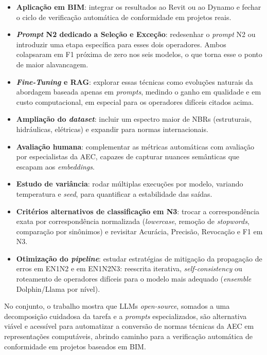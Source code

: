 \documentclass[a4paper,fleqn]{cas-sc}
\begin{document}
\begin{itemize}
    \item \textbf{Aplicação em BIM}: integrar os resultados ao Revit ou ao Dynamo e fechar o ciclo de verificação automática de conformidade em projetos reais.
    \item \textbf{\textit{Prompt} N2 dedicado a Seleção e Exceção}: redesenhar o \textit{prompt} N2 ou introduzir uma etapa específica para esses dois operadores. Ambos colapsaram em F1 próxima de zero nos seis modelos, o que torna esse o ponto de maior alavancagem.
    \item \textbf{\textit{Fine-Tuning} e RAG}: explorar essas técnicas como evoluções naturais da abordagem baseada apenas em \textit{prompts}, medindo o ganho em qualidade e em custo computacional, em especial para os operadores difíceis citados acima.
    \item \textbf{Ampliação do \textit{dataset}}: incluir um espectro maior de NBRs (estruturais, hidráulicas, elétricas) e expandir para normas internacionais.
    \item \textbf{Avaliação humana}: complementar as métricas automáticas com avaliação por especialistas da AEC, capazes de capturar nuances semânticas que escapam aos \textit{embeddings}.
    \item \textbf{Estudo de variância}: rodar múltiplas execuções por modelo, variando temperatura e \textit{seed}, para quantificar a estabilidade das saídas.
    \item \textbf{Critérios alternativos de classificação em N3}: trocar a correspondência exata por correspondência normalizada (\textit{lowercase}, remoção de \textit{stopwords}, comparação por sinônimos) e revisitar Acurácia, Precisão, Revocação e F1 em N3.
    \item \textbf{Otimização do \textit{pipeline}}: estudar estratégias de mitigação da propagação de erros em EN1N2 e em EN1N2N3: reescrita iterativa, \textit{self-consistency} ou roteamento de operadores difíceis para o modelo mais adequado (\textit{ensemble} Dolphin/Llama por nível).
\end{itemize}

No conjunto, o trabalho mostra que LLMs \textit{open-source}, somados a uma decomposição cuidadosa da tarefa e a \textit{prompts} especializados, são alternativa viável e acessível para automatizar a conversão de normas técnicas da AEC em representações computáveis, abrindo caminho para a verificação automática de conformidade em projetos baseados em BIM.

\printcredits



\end{document}
